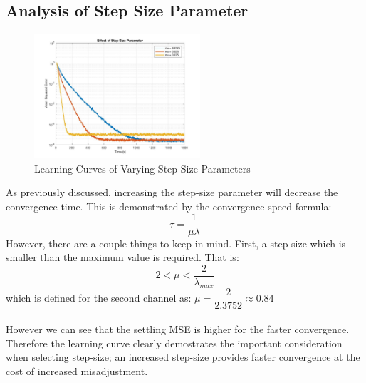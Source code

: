 \documentclass[journal]{IEEEtran}
\begin{document}
\subsection{Analysis of Step Size Parameter}
\vspace{-5mm}
\begin{figure}[H]
  \centering
  \captionsetup{justification=centering}
  \includegraphics[width=0.55\textwidth, inner] {Plots/Project1_Part4.jpg}
  \caption{Learning Curves of Varying Step Size Parameters}
    \label{fig:stepsize}
\end{figure}
As previously discussed, increasing the step-size parameter will decrease the
convergence time. This is demonstrated by the convergence speed formula:
$$ \tau = \dfrac{1}{\mu\lambda}$$ However, there are a couple things to keep in mind. First, a
step-size which is smaller than the maximum value is required. That is:
$$2 < \mu < \dfrac{2}{\lambda_{max}}$$
which is defined for the second channel as:
$\mu = \dfrac{2}{2.3752} \approx 0.84$
\\
\\
However we can see that the settling MSE is higher for the faster convergence. Therefore the learning curve
clearly demostrates the important consideration when selecting step-size; an increased step-size provides
faster convergence at the cost of increased misadjustment.
\end{document}
